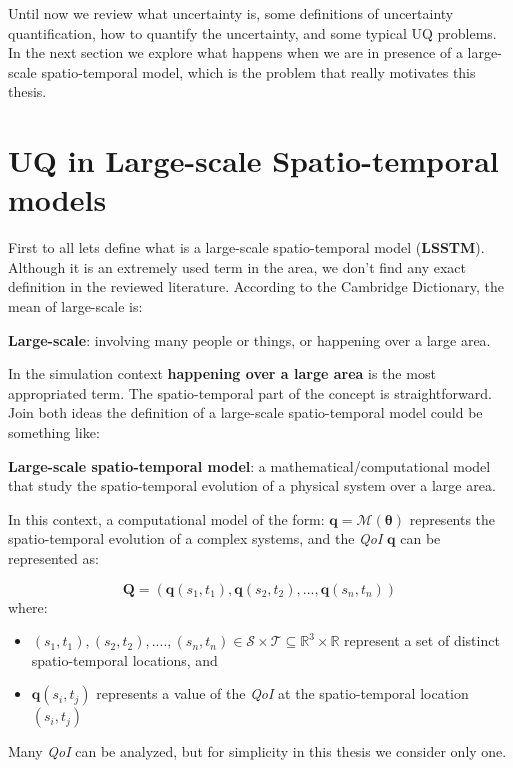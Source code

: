 Until now we review what uncertainty is, some definitions of uncertainty quantification, how to quantify the uncertainty, and some typical UQ problems. In the next section we explore what happens when we are in presence of a large-scale spatio-temporal model, which is the problem that really motivates this thesis.

\section{UQ in Large-scale Spatio-temporal models}\label{sec:uq_large_scale}
First to all lets define what is a large-scale spatio-temporal model (\textbf{LSSTM}). Although it is an extremely used term in the area, we don't find any exact definition in the reviewed literature. According to the Cambridge Dictionary, the mean of large-scale is:

\begin{defn}
\textbf{Large-scale}: involving many people or things, or happening over a large area.
\end{defn}

In the simulation context \textbf{happening over a large area} is the most appropriated term. The spatio-temporal part of the concept is straightforward. Join both ideas the definition of a large-scale spatio-temporal model could be something like:

\begin{defn}
\textbf{Large-scale spatio-temporal model}: a mathematical/computational model that study the spatio-temporal evolution of a physical system over a large area.
\end{defn}

In this context, a computational model of the form: $\bm{q}=\mathcal{M}(\bm{\theta})$ represents the spatio-temporal evolution of a complex systems, and the \textit{QoI} $\bm{q}$ can be represented as:  

\begin{equation} \label{eq:spatio_temporal}
\mathbf{Q} = (\mathbf{q}(s_{1},t_{1}),\mathbf{q}(s_{2},t_{2}),...,\mathbf{q}(s_{n},t_{n}))  
\end{equation}
where:
\begin{itemize}
\item $(s_{1},t_{1}),(s_{2},t_{2}),....,(s_{n},t_{n}) \in \mathcal{S} \times \mathcal{T}\subseteq\mathbb{R}^{3}\times\mathbb{R}$ represent a set of distinct spatio-temporal locations, and
\item $\mathbf{q}(s_{i},t_{j})$ represents a value of the \textit{QoI} at the spatio-temporal location $(s_{i},t_{j})$
\end{itemize}
Many \textit{QoI} can be analyzed, but for simplicity in this thesis we consider only one.

